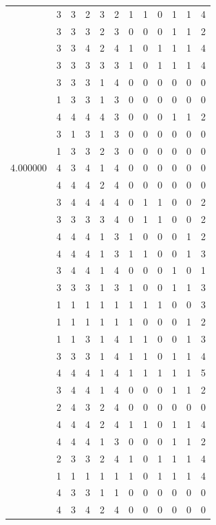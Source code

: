 \documentclass[]{book}
\theoremstyle{definition}
\theoremstyle{definition}
\theoremstyle{definition}
\theoremstyle{remark}
\begin{document}
\begin{table}
{\begin{tabular}[t]{rrrrrrrrrrrr}
 & 3 & 3 & 2 & 3 & 2 & 1 & 1 & 0 & 1 & 1 & 4\\
 & 3 & 3 & 3 & 2 & 3 & 0 & 0 & 0 & 1 & 1 & 2\\
 & 3 & 3 & 4 & 2 & 4 & 1 & 0 & 1 & 1 & 1 & 4\\
 & 3 & 3 & 3 & 3 & 3 & 1 & 0 & 1 & 1 & 1 & 4\\
 & 3 & 3 & 3 & 1 & 4 & 0 & 0 & 0 & 0 & 0 & 0\\
 & 1 & 3 & 3 & 1 & 3 & 0 & 0 & 0 & 0 & 0 & 0\\
 & 4 & 4 & 4 & 4 & 3 & 0 & 0 & 0 & 1 & 1 & 2\\
 & 3 & 1 & 3 & 1 & 3 & 0 & 0 & 0 & 0 & 0 & 0\\
 & 1 & 3 & 3 & 2 & 3 & 0 & 0 & 0 & 0 & 0 & 0\\
4.000000 & 4 & 3 & 4 & 1 & 4 & 0 & 0 & 0 & 0 & 0 & 0\\
 & 4 & 4 & 4 & 2 & 4 & 0 & 0 & 0 & 0 & 0 & 0\\
 & 3 & 4 & 4 & 4 & 4 & 0 & 1 & 1 & 0 & 0 & 2\\
 & 3 & 3 & 3 & 3 & 4 & 0 & 1 & 1 & 0 & 0 & 2\\
 & 4 & 4 & 4 & 1 & 3 & 1 & 0 & 0 & 0 & 1 & 2\\
 & 4 & 4 & 4 & 1 & 3 & 1 & 1 & 0 & 0 & 1 & 3\\
 & 3 & 4 & 4 & 1 & 4 & 0 & 0 & 0 & 1 & 0 & 1\\
 & 3 & 3 & 3 & 1 & 3 & 1 & 0 & 0 & 1 & 1 & 3\\
 & 1 & 1 & 1 & 1 & 1 & 1 & 1 & 1 & 0 & 0 & 3\\
 & 1 & 1 & 1 & 1 & 1 & 1 & 0 & 0 & 0 & 1 & 2\\
 & 1 & 1 & 3 & 1 & 4 & 1 & 1 & 0 & 0 & 1 & 3\\
 & 3 & 3 & 3 & 1 & 4 & 1 & 1 & 0 & 1 & 1 & 4\\
 & 4 & 4 & 4 & 1 & 4 & 1 & 1 & 1 & 1 & 1 & 5\\
 & 3 & 4 & 4 & 1 & 4 & 0 & 0 & 0 & 1 & 1 & 2\\
 & 2 & 4 & 3 & 2 & 4 & 0 & 0 & 0 & 0 & 0 & 0\\
 & 4 & 4 & 4 & 2 & 4 & 1 & 1 & 0 & 1 & 1 & 4\\
 & 4 & 4 & 4 & 1 & 3 & 0 & 0 & 0 & 1 & 1 & 2\\
 & 2 & 3 & 3 & 2 & 4 & 1 & 0 & 1 & 1 & 1 & 4\\
 & 1 & 1 & 1 & 1 & 1 & 1 & 0 & 1 & 1 & 1 & 4\\
 & 4 & 3 & 3 & 1 & 1 & 0 & 0 & 0 & 0 & 0 & 0\\
 & 4 & 3 & 4 & 2 & 4 & 0 & 0 & 0 & 0 & 0 & 0\\

\end{tabular}}
\end{table}
\end{document}

